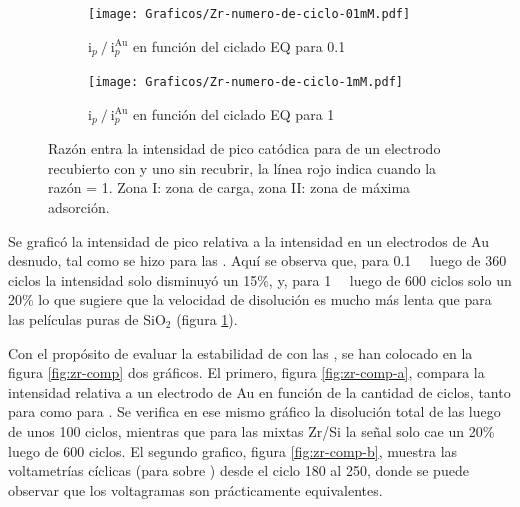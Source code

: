 		 			\begin{figure}[h!]
		 			\vspace*{-6mm}
			   	    \begin{subfigure}[t]{0.495\textwidth}
			        	\texttt{[image: Graficos/Zr-numero-de-ciclo-01mM.pdf]}
			        	\vspace*{-10mm}\caption{$\text{i}_p\mathbin{/}\text{i}_p^{\text{Au}}$ en función del ciclado EQ para \ru\space \SI{0.1}{\milli\Molar}}
			         	\end{subfigure}
			     		 \begin{subfigure}[t]{0.495\textwidth}
			        	\texttt{[image: Graficos/Zr-numero-de-ciclo-1mM.pdf]}
			        	\vspace*{-10mm}\caption{$\text{i}_p\mathbin{/}\text{i}_p^{\text{Au}}$ en función del ciclado EQ para \ru\space \SI{1}{\milli\Molar}}
			         	\end{subfigure}
			         	\caption[Intensidad en función del ciclado EQ para \pdmZ]{Razón entra la intensidad de pico catódica para \ru\space de un electrodo recubierto con \pdmZ\space y uno sin recubrir, la línea rojo indica cuando la razón = 1. Zona I: zona de carga, zona II: zona de máxima adsorción.}
			         	\label{fig:ventana-zr}
			         	\vspace{3mm}
			     	\end{figure}

		 Se graficó la intensidad de pico relativa a la intensidad en un electrodos de Au  desnudo, tal como se hizo para las \pdmF. Aquí se observa que, para \ru\space \SI{0.1}{\milli\Molar} luego de 360 ciclos la intensidad solo disminuyó un 15\%, y, para \ru\space \SI{1}{\milli\Molar} luego de 600 ciclos solo un 20\%  lo que sugiere que la velocidad de disolución es mucho más lenta que para las películas puras de SiO$_2$ (figura \ref{fig:ventana-zr}).
			     		
		 Con el propósito de evaluar la estabilidad de \pdmZ\space con las \pdmF, se han colocado en la figura \ref{fig:zr-comp} dos gráficos. El primero, figura \ref{fig:zr-comp-a}, compara la intensidad relativa a un electrodo de Au  en función de la cantidad de ciclos, tanto para \pdmZ\space como para \pdmF. Se verifica en ese mismo gráfico la disolución total de las \pdmF\space luego de unos 100 ciclos, mientras que para las mixtas Zr/Si la señal solo cae un 20\% luego de 600 ciclos. El segundo grafico, figura \ref{fig:zr-comp-b}, muestra las voltametrías cíclicas (para \ru\space sobre \pdmZ) desde el ciclo 180 al 250, donde se puede observar que los voltagramas son prácticamente equivalentes.


